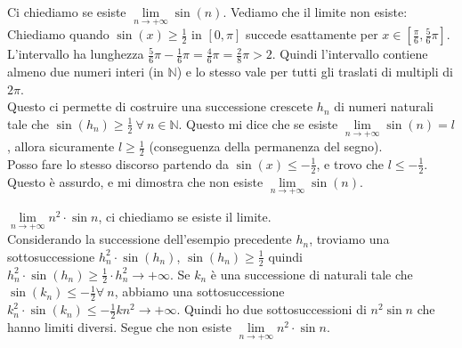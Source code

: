 \begin{example}
Ci chiediamo se esiste $\lim\limits_{n\to +\infty}\sin(n)$. Vediamo che il limite non esiste:\\
Chiediamo quando $\sin(x) \geq \frac{1}{2}$ in $[0,\pi]$ succede esattamente per $x \in [\frac{\pi}{6},\frac{5}{6}\pi]$. L'intervallo ha lunghezza $\frac{5}{6}\pi - \frac{1}{6}\pi = \frac{4}{6}\pi = \frac{2}{8}\pi > 2$. Quindi l'intervallo contiene almeno due numeri interi (in $\mathbb{N}$) e lo stesso vale per tutti gli traslati di multipli di $2\pi$.\\
Questo ci permette di costruire una successione crescete $h_n$ di numeri naturali tale che $\sin(h_n) \geq \frac{1}{2} \: \forall \: n \in \mathbb{N}$.
Questo mi dice che se esiste $\lim\limits_{n\to +\infty}\sin(n) = l$, allora sicuramente $l \geq \frac{1}{2}$ (conseguenza della permanenza del segno). \\
Posso fare lo stesso discorso partendo da $\sin(x) \leq -\frac{1}{2}$, e trovo che $l \leq -\frac{1}{2}$. Questo è assurdo, e mi dimostra che non esiste $\lim\limits_{n\to +\infty}\sin(n)$.
\end{example}

\begin{example}
$\lim\limits_{n\to +\infty}n^2 \cdot \sin{n}$, ci chiediamo se esiste il limite.\\
Considerando la successione dell'esempio precedente $h_n$, troviamo una sottosuccessione $h_n^2 \cdot \sin(h_n)$, $\sin(h_n) \geq \frac{1}{2}$ quindi $h_n^2 \cdot \sin(h_n) \geq \frac{1}{2}\cdot h_n^2 \to +\infty$. Se $k_n$ è una successione di naturali tale che $\sin(k_n) \leq -\frac{1}{2} \forall \: n$, abbiamo una sottosuccessione $k_n^2 \cdot \sin(k_n) \leq -\frac{1}{2}kn^2 \to +\infty$. Quindi ho due sottosuccessioni di $n^2\sin{n}$ che hanno limiti diversi. Segue che non esiste $\lim\limits_{n\to +\infty}n^2 \cdot \sin{n}$.
\end{example}

